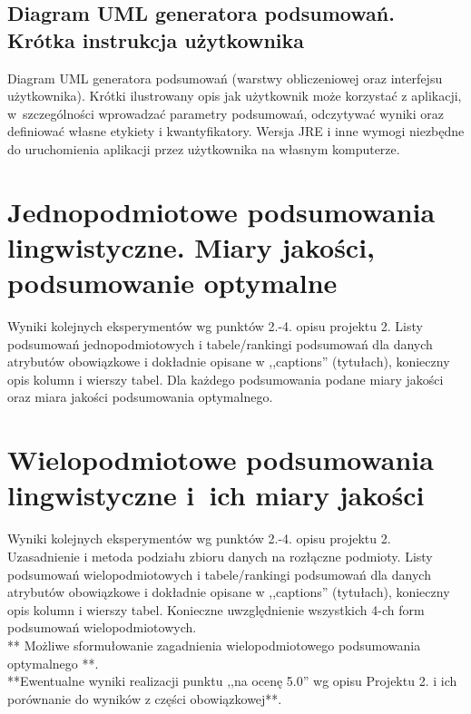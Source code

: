 \documentclass{classrep}
\begin{document}
\subsection{Diagram UML generatora podsumowań. Krótka instrukcja użytkownika} 
Diagram UML generatora podsumowań (warstwy obliczeniowej oraz interfejsu
użytkownika). Krótki ilustrowany opis jak użytkownik może korzystać z aplikacji, w~szczególności
wprowadzać parametry  podsumowań, odczytywać wyniki oraz definiować własne etykiety i
kwantyfikatory. Wersja JRE i inne wymogi niezbędne do uruchomienia aplikacji przez użytkownika na własnym komputerze. \\

\section{ Jednopodmiotowe podsumowania lingwistyczne. Miary jakości, podsumowanie optymalne}
Wyniki kolejnych eksperymentów wg punktów 2.-4. opisu projektu 2.  Listy podsumowań
jednopodmiotowych i tabele/rankingi podsumowań dla danych atrybutów obowiązkowe i dokładnie opisane w ,,captions'' (tytułach), konieczny opis kolumn i wierszy tabel. Dla każdego podsumowania podane miary jakości oraz miara jakości podsumowania
optymalnego.\\



\section{Wielopodmiotowe podsumowania lingwistyczne i~ich miary jakości} 
Wyniki kolejnych eksperymentów wg punktów 2.-4. opisu projektu 2. Uzasadnienie i
metoda podziału zbioru danych na rozłączne podmioty. Listy podsumowań
wielopodmiotowych i tabele/rankingi podsumowań dla danych atrybutów obowiązkowe i
dokładnie opisane w ,,captions'' (tytułach), konieczny opis kolumn i wierszy tabel.
Konieczne uwzględnienie wszystkich 4-ch form podsumowań wielopodmiotowych. 
\\ 

** Możliwe sformułowanie zagadnienia wielopodmiotowego podsumowania optymalnego **.\\

{**Ewentualne wyniki realizacji punktu ,,na ocenę 5.0'' wg opisu Projektu 2. i ich porównanie do wyników z
części obowiązkowej**.}\\
\end{document}
